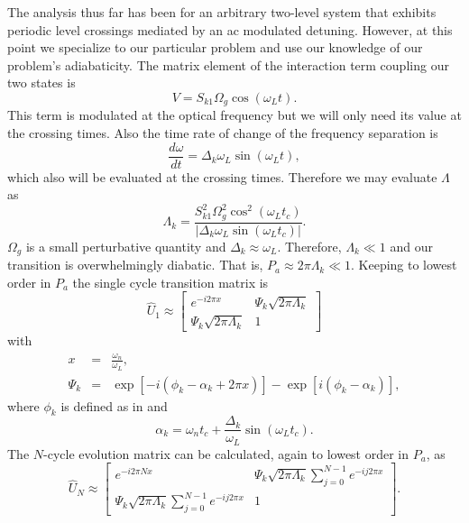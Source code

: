 The analysis thus far has been for an arbitrary two-level system that exhibits
periodic level crossings mediated by an ac modulated detuning.  However, at this
point we specialize to our particular problem and use our knowledge of our
problem's adiabaticity.  The matrix element of the interaction term coupling
our two states is
\begin{equation}
V = S_{k1} \Omega_g \cos(\omega_L t).
\end{equation}
This term is modulated at the optical frequency but we will only need
its value at the crossing times.  Also the time rate of change of
the frequency separation is
\begin{equation}
\frac{d\omega}{dt} = \Delta_k \omega_L \sin(\omega_L t),
\end{equation}
which also will be evaluated at the crossing times. Therefore we may evaluate
$\Lambda$ as
\begin{equation}
\Lambda_k = \frac{S_{k1}^2 \Omega_g^2 \cos^2(\omega_L t_c)}{\left|\Delta_k
\omega_L \sin(\omega_L t_c)\right| }.
\end{equation}
$\Omega_g$ is a small perturbative quantity and $\Delta_k \approx \omega_L$.
Therefore, $\Lambda_k \ll 1$ and our transition is overwhelmingly diabatic.
That is, $P_a \approx 2 \pi \Lambda_k \ll 1$.  Keeping to lowest order in $P_a$
the single cycle transition matrix is
\begin{equation}
\hat{U}_1 \approx \left[\begin{array}{cc}
               e^{-i 2 \pi x} & \Psi_k \sqrt{2 \pi \Lambda_k} \\
	       \Psi_k \sqrt{2 \pi \Lambda_k} & 1
	     \end{array}\right]
\end{equation}
with
\begin{eqnarray}
x &=& \frac{\omega_n}{\omega_L}, \\
\Psi_k &=& \exp\left[-i(\phi_k -\alpha_k+2\pi x)\right] - \exp\left[i
(\phi_k -\alpha_k)\right],
\end{eqnarray}
where $\phi_k$ is defined as in  and
\begin{equation}
\alpha_k = \omega_n t_c + \frac{\Delta_k}{\omega_L}\sin(\omega_L t_c).
\end{equation}
The $N$-cycle evolution matrix can be calculated, again to lowest order in
$P_a$, as
\begin{equation}
\hat{U}_N \approx \left[\begin{array}{cc}
    e^{-i2\pi N x} & \Psi_k \sqrt{2 \pi \Lambda_k}
    {\displaystyle \sum_{j=0}^{N-1}e^{-i j 2 \pi x}}  \\
    \Psi_k \sqrt{2 \pi \Lambda_k}{\displaystyle \sum_{j=0}^{N-1}e^{-i j
    2 \pi x}} & 1
    \end{array}\right].
\end{equation}
